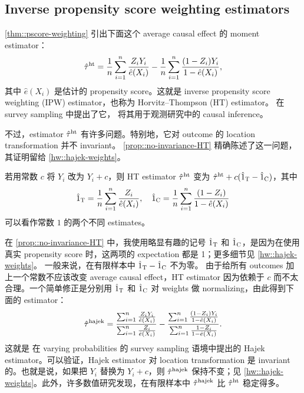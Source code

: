 \subsection{Inverse propensity score weighting estimators}\label{sec::ipw-estimators}

\cref{thm::pscore-weighting} 引出下面这个 average causal effect 的 moment estimator：
$$
\hat{\tau}^\textup{ht} = \frac{1}{n} \sum_{i=1}^n \frac{Z_i Y_i}{ \hat{e}(X_i) }
- \frac{1}{n} \sum_{i=1}^n \frac{ (1-Z_i) Y_i}{ 1 - \hat{e}(X_i) } ,
$$
其中 $\hat{e}(X_i)$ 是估计的 propensity score。这就是 inverse propensity score weighting (IPW) estimator，也称为 Horvitz--Thompson (HT) estimator。\citet{horvitz1952generalization} 在 survey sampling 中提出了它，\citet{rosenbaum1987model} 将其用于观测研究中的 causal inference。


不过，estimator $\hat{\tau}^\textup{ht}$ 有许多问题。特别地，它对 outcome 的 location transformation 并不 invariant。
\cref{prop::no-invariance-HT} 精确陈述了这一问题，其证明留给 \cref{hw::hajek-weights}。

\begin{proposition}
\label{prop::no-invariance-HT}
若用常数 $c$ 将 $Y_i$ 改为 $Y_i+c$，则 HT estimator $\hat{\tau}^\textup{ht}$ 变为 $\hat{\tau}^\textup{ht} + c (\hat{ 1 }_\textsc{T} - \hat{ 1 }_\textsc{C})$，其中
$$
\hat{ 1 }_\textsc{T}=   \frac{1}{n} \sum_{i=1}^n \frac{Z_i }{ \hat{e}(X_i) } ,\quad
\hat{ 1 }_\textsc{C} =\frac{1}{n} \sum_{i=1}^n \frac{ (1-Z_i) }{ 1 - \hat{e}(X_i) }   
$$
可以看作常数 $1$ 的两个不同 estimates。
\end{proposition}

在 \cref{prop::no-invariance-HT} 中，我使用略显有趣的记号 $\hat{ 1 }_\textsc{T} $ 和 $ \hat{ 1 }_\textsc{C}$，是因为在使用真实 propensity score 时，这两项的 expectation 都是 1；更多细节见 \cref{hw::hajek-weights}。
一般来说，在有限样本中 $\hat{ 1 }_\textsc{T} - \hat{ 1 }_\textsc{C}$ 不为零。
由于给所有 outcomes 加上一个常数不应该改变 average causal effect，HT estimator 因为依赖于 $c$ 而不太合理。一个简单修正是分别用 $\hat{ 1 }_\textsc{T}  $ 和 $\hat{ 1 }_\textsc{C} $ 对 weights 做 normalizing，由此得到下面的 estimator：
$$
\hat{\tau}^\textup{hajek} = \frac{  \sum_{i=1}^n \frac{Z_i Y_i}{ \hat{e}(X_i) }  }{  \sum_{i=1}^n \frac{Z_i }{ \hat{e}(X_i) } }
- \frac{  \sum_{i=1}^n \frac{ (1-Z_i) Y_i}{ 1 - \hat{e}(X_i) }  }{  \sum_{i=1}^n \frac{ 1-Z_i}{ 1 - \hat{e}(X_i) }  }.
$$
这就是 \citet{hajek1971comment} 在 varying probabilities 的 survey sampling 语境中提出的 Hajek estimator。可以验证，Hajek estimator 对 location transformation 是 invariant 的。也就是说，如果把 $Y_i$ 替换为 $Y_i + c$，则 $\hat{\tau}^\textup{hajek}$ 保持不变；见 \cref{hw::hajek-weights}。此外，许多数值研究发现，在有限样本中 $\hat{\tau}^\textup{hajek}$ 比 $\hat{\tau}^\textup{ht}$ 稳定得多。





